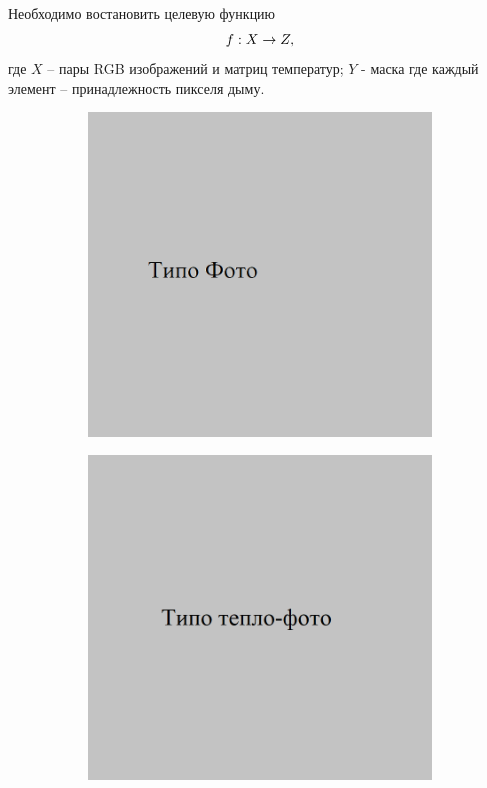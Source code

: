 \documentclass[t]{beamer}
\begin{document}
	\begin{frame}
		\frametitle{\insertsection} 
		Необходимо востановить целевую функцию
		\vspace*{-0.2cm}
		\begin{equation}
			f: X \rightarrow Z,
			\label{eq:segment_func}
			\vspace*{-0.3cm}
		\end{equation}
	где $X$ -- пары RGB изображений и матриц температур;
	$Y$ - маска где каждый элемент -- принадлежность пикселя дыму.
	\begin{figure}[ht!]
		\begin{subfigure}{.23\textwidth}
			\centering
			\includegraphics[width = \textwidth]{image/opt_examp}
			\caption{}
		\end{subfigure}
		\begin{subfigure}{.23\textwidth}
			\centering
			\includegraphics[width = \textwidth]{image/tep_examp}

\end{subfigure}
\end{figure}
\end{frame}
\end{document}
